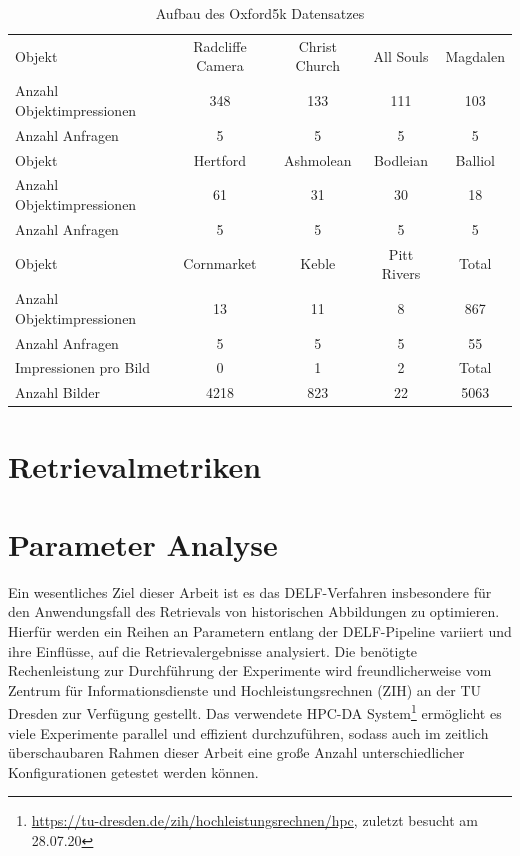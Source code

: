 \begin{table}[h]
\centering
\begin{tabular}{l|c|c|c|c}
\rowcolor[HTML]{C0C0C0} 
Objekt                 & Radcliffe Camera & Christ Church & All Souls   & Magdalen \\
Anzahl Objektimpressionen & 348              & 133           & 111         & 103      \\
Anzahl Anfragen           & 5                & 5             & 5           & 5        \\ \hline
\rowcolor[HTML]{C0C0C0} 
Objekt                & Hertford         & Ashmolean     & Bodleian    & Balliol  \\
Anzahl Objektimpressionen & 61               & 31            & 30          & 18       \\
Anzahl Anfragen           & 5                & 5             & 5           & 5        \\ \hline
\rowcolor[HTML]{C0C0C0} 
Objekt                 & Cornmarket       & Keble         & Pitt Rivers & Total    \\
Anzahl Objektimpressionen & 13               & 11            & 8           & 867      \\
Anzahl Anfragen           & 5                & 5             & 5           & 55       \\ \hline
\rowcolor[HTML]{C0C0C0} 
Impressionen pro Bild     & 0                & 1             & 2           & Total    \\
Anzahl Bilder             & 4218             & 823           & 22          & 5063    
\end{tabular}%
\caption{Aufbau des Oxford5k Datensatzes}
\label{oxford5k_data}
\end{table}



\section{Retrievalmetriken}

\section{Parameter Analyse}

Ein wesentliches Ziel dieser Arbeit ist es das DELF-Verfahren insbesondere für den Anwendungsfall des Retrievals von historischen Abbildungen zu optimieren. Hierfür werden ein Reihen an Parametern entlang der DELF-Pipeline variiert und ihre Einflüsse, auf die Retrievalergebnisse analysiert.
Die benötigte Rechenleistung zur Durchführung der Experimente wird freundlicherweise vom 
Zentrum für Informationsdienste und Hochleistungsrechnen (ZIH) an der TU Dresden zur Verfügung gestellt. Das verwendete HPC-DA System\footnote{\url{https://tu-dresden.de/zih/hochleistungsrechnen/hpc}, zuletzt besucht am 28.07.20} ermöglicht es viele Experimente parallel und effizient durchzuführen, sodass auch im zeitlich überschaubaren Rahmen dieser Arbeit eine große Anzahl unterschiedlicher Konfigurationen getestet werden können.


